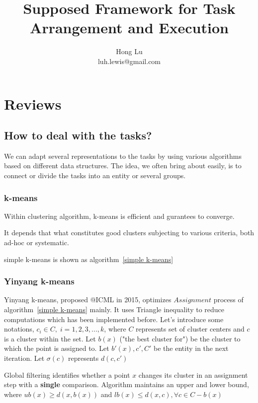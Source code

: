 \documentclass[12pt, a4paper]{article}
\author{Hong Lu \\ luh.lewis@gmail.com}
\date{}
\begin{document}
    \title{Supposed Framework for Task Arrangement and Execution}
    \maketitle

    \section{Reviews}
    \subsection*{How to deal with the tasks?}
    We can adapt several representations to the tasks by using various algorithms based on different data structures.
    The idea, we often bring about easily, is to connect or divide the tasks into an entity or several groups.
    \subsubsection*{k-means}
    Within clustering algorithm, k-means is efficient and gurantees to converge. 
    
    It depends that what constitutes good clusters subjecting to various criteria, both ad-hoc or systematic.  
    
    simple k-means is shown as algorithm~\ref{simple k-means}
    
    \subsubsection*{Yinyang k-means}
    Yinyang k-means, proposed @ICML in 2015, optimizes $Assignment$ process of algorithm~\ref{simple k-means} mainly. 
    It uses Triangle inequality to reduce computations which has been implemented before.
    Let's introduce some notations, $c_{i} \in C,\; i = 1,2,3,...,k$, where $C$ represents set of cluster centers and $c$ is a cluster within the set.
    Let $b(x)$ ("the best cluster for") be the cluster to which the point is assigned to. Let $b'(x), c',C'$ be the entity in the next iteration.
    Let $\sigma(c)$ represents $d(c, c')$

    Global filtering identifies whether a point $x$ changes its cluster in an assignment step with a \textbf{single} comparison.
    Algorithm maintains an upper and lower bound, where $ub(x) \geq d(x, b(x))$ and $lb(x) \leq d(x,c), \forall c \in C-b(x)$
\end{document}
